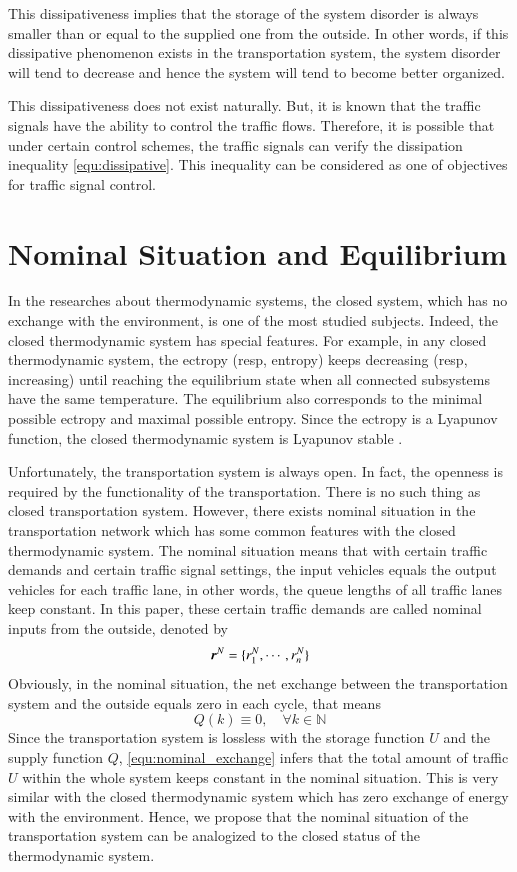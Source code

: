 \documentclass[preprint,authoryear,12pt]{elsarticle}
\renewcommand{\vec}[1]{\mbox{\boldmath$#1$}}
\begin{document}
This dissipativeness implies that the storage of the system disorder is always smaller than or equal to the supplied one from the outside. In other words, if this dissipative phenomenon exists in the transportation system, the system disorder will tend to decrease and hence the system will tend to become better organized.

This dissipativeness does not exist naturally. But, it is known that the traffic signals have the ability to control the traffic flows. Therefore, it is possible that under certain control schemes, the traffic signals can verify the dissipation inequality \eqref{equ:dissipative}. This inequality can be considered as one of objectives for traffic signal control.

\section{Nominal Situation and Equilibrium}

In the researches about thermodynamic systems, the closed system, which has no exchange with the environment, is one of the most studied subjects. Indeed, the closed thermodynamic system has special features. For example, in any closed thermodynamic system, the ectropy (resp, entropy) keeps decreasing (resp, increasing) until reaching the equilibrium state when all connected subsystems have the same temperature. The equilibrium also corresponds to the minimal possible ectropy and maximal possible entropy. Since the ectropy is a Lyapunov function, the closed thermodynamic system is Lyapunov stable \citep{haddad_thermodynamic_2005}.

Unfortunately, the transportation system is always open. In fact, the openness is required by the functionality of the transportation. There is no such thing as closed transportation system. However, there exists nominal situation \citep{diakaki_multivariable_2002} in the transportation network which has some common features with the closed thermodynamic system. The nominal situation means that with certain traffic demands and certain traffic signal settings, the input vehicles equals the output vehicles for each traffic lane, in other words, the queue lengths of all traffic lanes keep constant. In this paper, these certain traffic demands are called nominal inputs from the outside, denoted by
$$\vec{r}^N=\{r_1^N,\cdots,r_n^N\}$$
Obviously, in the nominal situation, the net exchange between the transportation system and the outside equals zero in each cycle, that means
\begin{equation}\label{equ:nominal_exchange}
Q(k)\equiv 0, \quad \forall k\in\mathbb{N}
\end{equation}
Since the transportation system is lossless with the storage function $U$ and the supply function $Q$, \eqref{equ:nominal_exchange} infers that the total amount of traffic $U$ within the whole system keeps constant in the nominal situation. This is very similar with the closed thermodynamic system which has zero exchange of energy with the environment. Hence, we propose that the nominal situation of the transportation system can be analogized to the closed status of the thermodynamic system.
\end{document}
